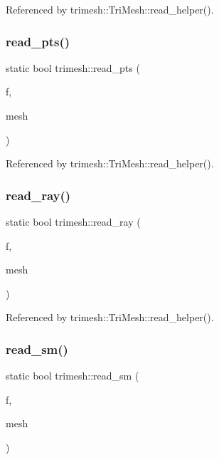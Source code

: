 Referenced by trimesh\+::\+Tri\+Mesh\+::read\+\_\+helper().

\mbox{\label{namespacetrimesh_a964f33d0b4d230bcdab3f3fc73946fa7}} 
\subsubsection{\texorpdfstring{read\+\_\+pts()}{read\_pts()}}
{\footnotesize\ttfamily static bool trimesh\+::read\+\_\+pts (\begin{DoxyParamCaption}\item[{F\+I\+LE $\ast$}]{f,  }\item[{\hyperlink{classtrimesh_1_1TriMesh}{Tri\+Mesh} $\ast$}]{mesh }\end{DoxyParamCaption})\hspace{0.3cm}{\ttfamily [static]}}



Referenced by trimesh\+::\+Tri\+Mesh\+::read\+\_\+helper().

\mbox{\label{namespacetrimesh_a8a73e582eb0a3e4df256a4eb7e226cff}} 
\subsubsection{\texorpdfstring{read\+\_\+ray()}{read\_ray()}}
{\footnotesize\ttfamily static bool trimesh\+::read\+\_\+ray (\begin{DoxyParamCaption}\item[{F\+I\+LE $\ast$}]{f,  }\item[{\hyperlink{classtrimesh_1_1TriMesh}{Tri\+Mesh} $\ast$}]{mesh }\end{DoxyParamCaption})\hspace{0.3cm}{\ttfamily [static]}}



Referenced by trimesh\+::\+Tri\+Mesh\+::read\+\_\+helper().

\mbox{\label{namespacetrimesh_a0a31a91f293a9ead6c5c3f87e5e234dc}} 
\subsubsection{\texorpdfstring{read\+\_\+sm()}{read\_sm()}}
{\footnotesize\ttfamily static bool trimesh\+::read\+\_\+sm (\begin{DoxyParamCaption}\item[{F\+I\+LE $\ast$}]{f,  }\item[{\hyperlink{classtrimesh_1_1TriMesh}{Tri\+Mesh} $\ast$}]{mesh }\end{DoxyParamCaption})\hspace{0.3cm}{\ttfamily [static]}}



